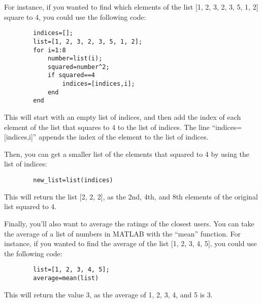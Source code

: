 \documentclass{ximera}
\begin{document}
\begin{exploration}
\begin{problem}
\begin{hint}
      For instance, if you wanted to find which elements of the list [1, 2, 3, 2, 3, 5, 1, 2] square to 4, you could use the following code:
      \begin{verbatim}
        indices=[];
        list=[1, 2, 3, 2, 3, 5, 1, 2];
        for i=1:8
            number=list(i);
            squared=number^2;
            if squared==4
                indices=[indices,i];
            end
        end
      \end{verbatim}
      
      This will start with an empty list of indices, and then add the index of each element of the list that squares to 4 to the list of indices. The line ``indices=[indices,i]'' appends the index of the element to the list of indices.

      Then, you can get a smaller list of the elements that squared to 4 by using the list of indices:
      \begin{verbatim}
        new_list=list(indices)
      \end{verbatim}
        


      This will return the list [2, 2, 2], as the 2nd, 4th, and 8th elements of the original list squared to 4.

      Finally, you'll also want to average the ratings of the closest users. You can take the average of a list of numbers in MATLAB with the ``mean'' function. For instance, if you wanted to find the average of the list [1, 2, 3, 4, 5], you could use the following code:

      \begin{verbatim}
        list=[1, 2, 3, 4, 5];
        average=mean(list)        
      \end{verbatim}



      This will return the value 3, as the average of 1, 2, 3, 4, and 5 is 3.

    \end{hint}

    \end{problem}
      
      \end{exploration}
\end{document}
